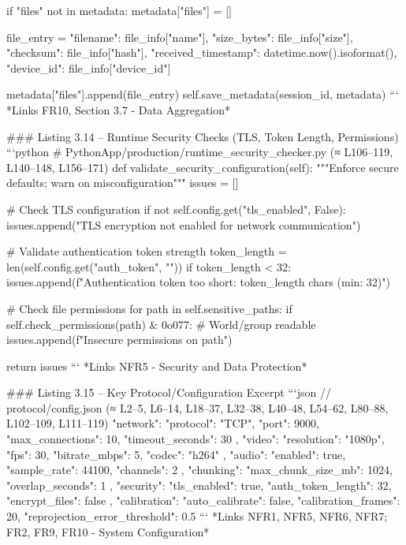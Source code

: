 \documentclass[12pt,a4paper]{article}
\begin{document}
{    if "files" not in metadata:
        metadata["files"] = []
    
    file_entry = {
        "filename": file_info["name"],
        "size_bytes": file_info["size"],
        "checksum": file_info["hash"],
        "received_timestamp": datetime.now().isoformat(),
        "device_id": file_info["device_id"]
    }
    
    metadata["files"].append(file_entry)
    self.save_metadata(session_id, metadata)
```
*Links FR10, Section 3.7 - Data Aggregation*

### Listing 3.14 – Runtime Security Checks (TLS, Token Length, Permissions)
```python
# PythonApp/production/runtime_security_checker.py (≈ L106–119, L140–148, L156–171)
def validate_security_configuration(self):
    """Enforce secure defaults; warn on misconfiguration"""
    issues = []
    
    # Check TLS configuration
    if not self.config.get("tls_enabled", False):
        issues.append("TLS encryption not enabled for network communication")
    
    # Validate authentication token strength
    token_length = len(self.config.get("auth_token", ""))
    if token_length < 32:
        issues.append(f"Authentication token too short: {token_length} chars (min: 32)")
    
    # Check file permissions
    for path in self.sensitive_paths:
        if self.check_permissions(path) & 0o077:  # World/group readable
            issues.append(f"Insecure permissions on {path}")
    
    return issues
```
*Links NFR5 - Security and Data Protection*

### Listing 3.15 – Key Protocol/Configuration Excerpt
```json
// protocol/config.json (≈ L2–5, L6–14, L18–37, L32–38, L40–48, L54–62, L80–88, L102–109, L111–119)
{
  "network": {
    "protocol": "TCP",
    "port": 9000,
    "max_connections": 10,
    "timeout_seconds": 30
  },
  "video": {
    "resolution": "1080p",
    "fps": 30,
    "bitrate_mbps": 5,
    "codec": "h264"
  },
  "audio": {
    "enabled": true,
    "sample_rate": 44100,
    "channels": 2
  },
  "chunking": {
    "max_chunk_size_mb": 1024,
    "overlap_seconds": 1
  },
  "security": {
    "tls_enabled": true,
    "auth_token_length": 32,
    "encrypt_files": false
  },
  "calibration": {
    "auto_calibrate": false,
    "calibration_frames": 20,
    "reprojection_error_threshold": 0.5
  }
}
```
*Links NFR1, NFR5, NFR6, NFR7; FR2, FR9, FR10 - System Configuration*

}
\end{document}
